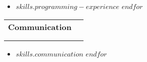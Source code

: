 \documentclass[letterpaper,11pt]{article}
\makeatletter
\newcommand{\ressubheading}[4]{\vspace{-7pt}
\begin{tabular*}{7in}{l@{\extracolsep{\fill}}r}
	\textbf{#1} & #2 \\
	\ifstrempty{#3}{
	}{
		\textit{#3} & #4 \\
	}
\end{tabular*}\vspace{-6pt}}
\makeatother
\begin{document}
\begin{multicols*}{4}
%
	\begin{itemize}
		$for(skills.programming-experience)$
			\item{$skills.programming-experience$}\vspace{-7pt}
		$endfor$
	\end{itemize}
\vfill\null
\columnbreak

\ressubheading{Communication}{}{}{}
	\begin{itemize}
		$for(skills.communication)$
			\item{$skills.communication$}\vspace{-7pt}
		$endfor$
	\end{itemize}
\end{multicols*}
% 
\end{document}
